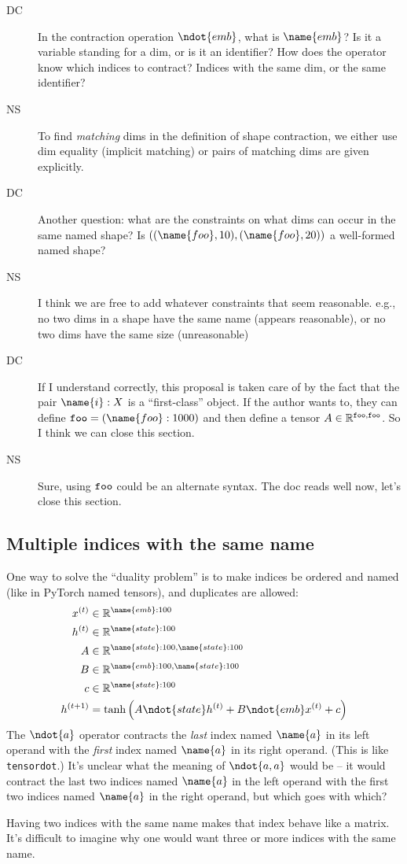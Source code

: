 \begin{description}
\item[DC] In the contraction operation $\ndot{emb}$, what is $\name{emb}$? Is it a variable standing for a dim, or is it an identifier? How does the operator know which indices to contract? Indices with the same dim, or the same identifier?
\item[NS] To find {\it matching} dims in the definition of shape contraction, we either use dim equality (implicit matching) or pairs of matching dims are given explicitly.
\item[DC] Another question: what are the constraints on what dims can occur in the same named shape? Is $((\name{foo}, 10), (\name{foo}, 20))$ a well-formed named shape?
\item[NS] I think we are free to add whatever constraints that seem reasonable. e.g., no two dims in a shape have the same name (appears reasonable), or no two dims have the same size (unreasonable)
\item[DC] If I understand correctly, this proposal is taken care of by the fact that the pair $\name{i}:X$ is a ``first-class'' object. If the author wants to, they can define $\ndim{foo} = (\name{foo}:1000)$ and then define a tensor $A \in \mathbb{R}^{{\tt foo}, {\tt foo}}$. So I think we can close this section.
\item[NS] Sure, using ${\tt foo}$ could be an alternate syntax. The doc reads well now, let's close this section.
\end{description}



\subsection{Multiple indices with the same name}

One way to solve the ``duality problem'' is to make indices be ordered and named (like in PyTorch named tensors), and duplicates are allowed:
\begin{align*}
x^{(t)} &\in \mathbb{R}^{\name{emb}: 100} \\
h^{(t)} &\in \mathbb{R}^{\name{state}: 100} \\
A &\in \mathbb{R}^{\name{state}: 100, \name{state}: 100} \\
B &\in \mathbb{R}^{\name{emb}: 100, \name{state}: 100} \\
c &\in \mathbb{R}^{\name{state}: 100} \\
h^{(t+1)} &= \tanh\left( A \ndot{state} h^{(t)} + B \ndot{emb} x^{(t)} + c \right)
\end{align*}
The $\ndot{a}$ operator contracts the \emph{last} index named $\name{a}$ in its left operand with the \emph{first} index named $\name{a}$ in its right operand. (This is like \verb|tensordot|.) It's unclear what the meaning of $\ndot{a,a}$ would be -- it would contract the last two indices named $\name{a}$ in the left operand with the first two indices named $\name{a}$ in the right operand, but which goes with which?

Having two indices with the same name makes that index behave like a matrix. It's difficult to imagine why one would want three or more indices with the same name.